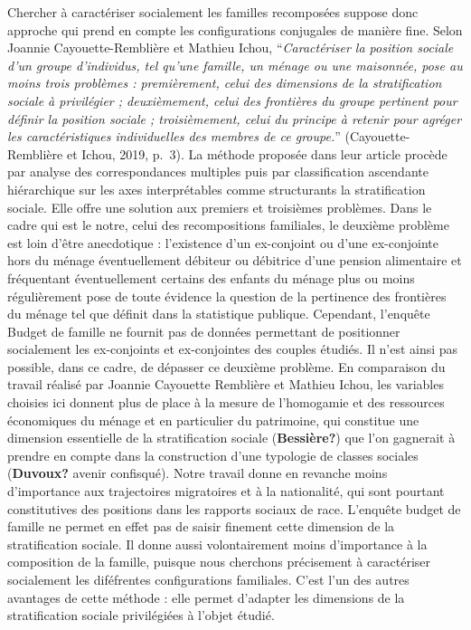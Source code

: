 \documentclass[
  12pt,
]{book}
\begin{document}
Chercher à caractériser socialement les familles recomposées suppose
donc approche qui prend en compte les configurations conjugales de
manière fine. Selon Joannie Cayouette-Remblière et Mathieu Ichou,
``\emph{Caractériser la position sociale d'un groupe d'individus, tel
qu'une famille, un ménage ou une maisonnée, pose au moins trois
problèmes : premièrement, celui des dimensions de la stratification
sociale à privilégier ; deuxièmement, celui des frontières du groupe
pertinent pour définir la position sociale ; troisièmement, celui du
principe à retenir pour agréger les caractéristiques individuelles des
membres de ce groupe.}'' (Cayouette-Remblière et Ichou, 2019, p.~3). La
méthode proposée dans leur article procède par analyse des
correspondances multiples puis par classification ascendante
hiérarchique sur les axes interprétables comme structurants la
stratification sociale. Elle offre une solution aux premiers et
troisièmes problèmes. Dans le cadre qui est le notre, celui des
recompositions familiales, le deuxième problème est loin d'être
anecdotique : l'existence d'un ex-conjoint ou d'une ex-conjointe hors du
ménage éventuellement débiteur ou débitrice d'une pension alimentaire et
fréquentant éventuellement certains des enfants du ménage plus ou moins
régulièrement pose de toute évidence la question de la pertinence des
frontières du ménage tel que définit dans la statistique publique.
Cependant, l'enquête Budget de famille ne fournit pas de données
permettant de positionner socialement les ex-conjoints et ex-conjointes
des couples étudiés. Il n'est ainsi pas possible, dans ce cadre, de
dépasser ce deuxième problème. En comparaison du travail réalisé par
Joannie Cayouette Remblière et Mathieu Ichou, les variables choisies ici
donnent plus de place à la mesure de l'homogamie et des ressources
économiques du ménage et en particulier du patrimoine, qui constitue une
dimension essentielle de la stratification sociale (\textbf{Bessière?})
que l'on gagnerait à prendre en compte dans la construction d'une
typologie de classes sociales (\textbf{Duvoux?} avenir confisqué). Notre
travail donne en revanche moins d'importance aux trajectoires
migratoires et à la nationalité, qui sont pourtant constitutives des
positions dans les rapports sociaux de race. L'enquête budget de famille
ne permet en effet pas de saisir finement cette dimension de la
stratification sociale. Il donne aussi volontairement moins d'importance
à la composition de la famille, puisque nous cherchons précisement à
caractériser socialement les diféfrentes configurations familiales.
C'est l'un des autres avantages de cette méthode : elle permet d'adapter
les dimensions de la stratification sociale privilégiées à l'objet
étudié.
\end{document}
